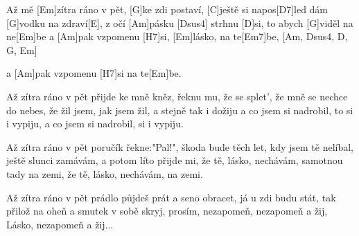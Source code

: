 
Až mě [Em]zítra ráno v pět,
[G]ke zdi postaví,
[C]ještě si napos[D7]led
dám [G]vodku na zdraví[E],
z očí [Am]pásku [Dsus4] strhnu [D]si,
to abych [G]viděl na ne[Em]be
a [Am]pak vzpomenu [H7]si,
[Em]lásko, na te[Em7]be,
[Am, Dsus4, D, G, Em] 

a [Am]pak vzpomenu [H7]si na te[Em]be.\slpc

Až zítra ráno v pět přijde ke mně kněz,
řeknu mu, že se splet', že mně se nechce do nebes,
že žil jsem, jak jsem žil, a stejně tak i dožiju
a co jsem si nadrobil, to si i vypiju,
a co jsem si nadrobil, si i vypiju.

Až zítra ráno v pět poručík řekne:"Pal!",
škoda bude těch let, kdy jsem tě nelíbal,
ještě slunci zamávám, a potom líto přijde mi,
že tě, lásko, nechávám, samotnou tady na zemi,
že tě, lásko, nechávám, na zemi.

Až zítra ráno v pět prádlo půjdeš prát
a seno obracet, já u zdi budu stát,
tak přilož na oheň a smutek v sobě skryj,
prosím, nezapomeň, nezapomeň a žij,
Lásko, nezapomeň a žij...

